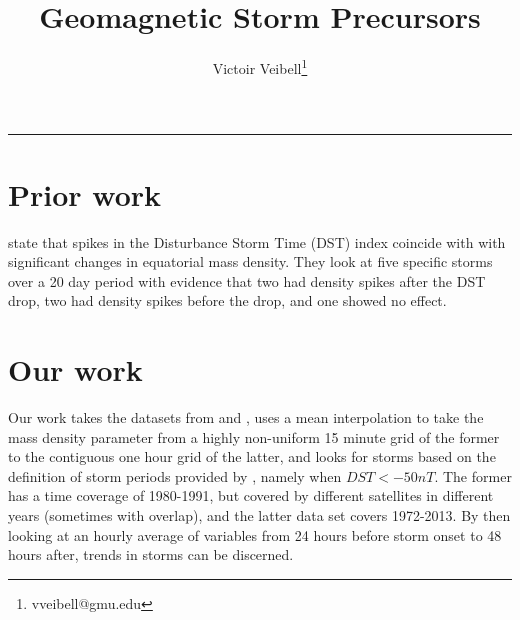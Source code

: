 \documentclass[10pt]{article}
\begin{document}
\title{Geomagnetic Storm Precursors}
\author{Victoir Veibell\footnote{vveibell@gmu.edu}}
\maketitle
\hrule
\setlength{\parskip}{3ex}
\renewcommand{\labelitemi}{$-$}

\section{Prior work}
\citep{Takahashi} state that spikes in the Disturbance Storm Time (DST) index coincide with with significant changes in equatorial mass density. They look at five specific storms over a 20 day period with evidence that two had density spikes after the DST drop, two had density spikes before the drop, and one showed no effect. 

\section{Our work}
Our work takes the datasets from \citep{Denton} and \citep{Reconstruction}, uses a mean interpolation to take the mass density parameter from a highly non-uniform 15 minute grid of the former to the contiguous one hour grid of the latter, and looks for storms based on the definition of storm periods provided by \citep{Takahashi}, namely when $DST<-50nT$. The former has a time coverage of 1980-1991, but covered by different satellites in different years (sometimes with overlap), and the latter data set covers 1972-2013. By then looking at an hourly average of variables from 24 hours before storm onset to 48 hours after, trends in storms can be discerned. 





\end{document}
